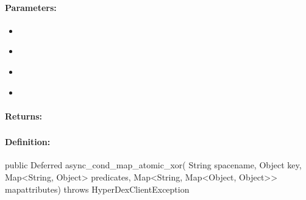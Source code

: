 \paragraph{Parameters:}
\begin{itemize}[noitemsep]
\item {}\\

\item {}\\

\item {}\\

\item {}\\

\end{itemize}

\paragraph{Returns:}


\pagebreak
\subsubsection{}
\label{api:java:async_cond_map_atomic_xor}


\paragraph{Definition:}
\begin{javacode}
public Deferred async_cond_map_atomic_xor(
        String spacename,
        Object key,
        Map<String, Object> predicates,
        Map<String, Map<Object, Object>> mapattributes) throws HyperDexClientException
\end{javacode}

